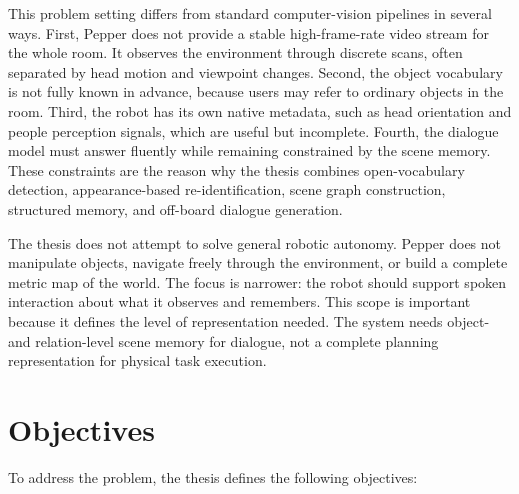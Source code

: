 This problem setting differs from standard computer-vision pipelines in several ways. First, Pepper does not provide a stable high-frame-rate video stream for the whole room. It observes the environment through discrete scans, often separated by head motion and viewpoint changes. Second, the object vocabulary is not fully known in advance, because users may refer to ordinary objects in the room. Third, the robot has its own native metadata, such as head orientation and people perception signals, which are useful but incomplete. Fourth, the dialogue model must answer fluently while remaining constrained by the scene memory. These constraints are the reason why the thesis combines open-vocabulary detection, appearance-based re-identification, scene graph construction, structured memory, and off-board dialogue generation.

The thesis does not attempt to solve general robotic autonomy. Pepper does not manipulate objects, navigate freely through the environment, or build a complete metric map of the world. The focus is narrower: the robot should support spoken interaction about what it observes and remembers. This scope is important because it defines the level of representation needed. The system needs object- and relation-level scene memory for dialogue, not a complete planning representation for physical task execution.

\section{Objectives}\label{sec:intro-objectives}

To address the problem, the thesis defines the following objectives:

